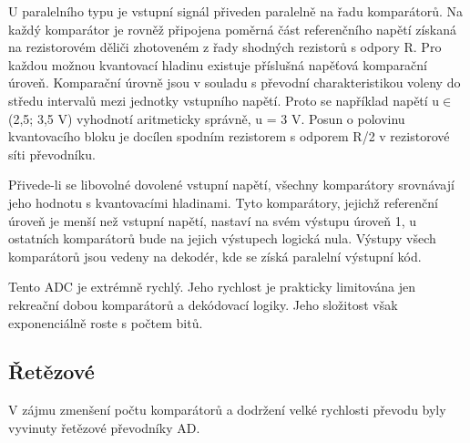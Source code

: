 U paralelního typu je vstupní signál přiveden paralelně na řadu komparátorů. Na každý komparátor je rovněž připojena poměrná část referenčního napětí získaná na rezistorovém děliči zhotoveném z řady shodných rezistorů s odpory R. Pro každou možnou kvantovací hladinu existuje příslušná napěťová komparační úroveň. Komparační úrovně jsou v souladu s převodní charakteristikou  voleny do středu intervalů mezi jednotky vstupního napětí. Proto se například napětí u$\in$(2,5; 3,5 V) vyhodnotí aritmeticky správně, u = 3 V. Posun o polovinu kvantovacího bloku je docílen spodním rezistorem s odporem R/2 v rezistorové síti převodníku.

Přivede-li se libovolné dovolené vstupní napětí, všechny komparátory srovnávají jeho hodnotu s kvantovacími hladinami. Tyto komparátory, jejichž referenční úroveň je menší než vstupní napětí, nastaví na svém výstupu úroveň 1, u ostatních komparátorů bude na jejich výstupech logická nula. Výstupy všech komparátorů jsou vedeny na dekodér, kde se získá paralelní výstupní kód.

Tento ADC je
extrémně rychlý. Jeho rychlost je prakticky limitována jen rekreační dobou komparátorů
a dekódovací logiky. Jeho složitost však exponenciálně roste s počtem bitů.

\subsection{Řetězové}
V zájmu zmenšení počtu komparátorů a dodržení velké rychlosti převodu byly vyvinuty řetězové převodníky AD.

